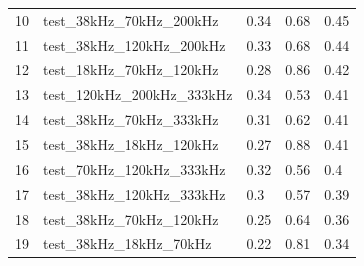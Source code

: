 \begin{longtable}{lllll}
10                     & test\_38kHz\_70kHz\_200kHz                  & 0.34                           & 0.68                        & 0.45                           \\
11                     & test\_38kHz\_120kHz\_200kHz                 & 0.33                           & 0.68                        & 0.44                           \\
12                     & test\_18kHz\_70kHz\_120kHz                  & 0.28                           & 0.86                        & 0.42                           \\
13                     & test\_120kHz\_200kHz\_333kHz                & 0.34                           & 0.53                        & 0.41                           \\
14                     & test\_38kHz\_70kHz\_333kHz                  & 0.31                           & 0.62                        & 0.41                           \\
15                     & test\_38kHz\_18kHz\_120kHz                  & 0.27                           & 0.88                        & 0.41                           \\
16                     & test\_70kHz\_120kHz\_333kHz                 & 0.32                           & 0.56                        & 0.4                            \\
17                     & test\_38kHz\_120kHz\_333kHz                 & 0.3                            & 0.57                        & 0.39                           \\
18                     & test\_38kHz\_70kHz\_120kHz                  & 0.25                           & 0.64                        & 0.36                           \\
19                     & test\_38kHz\_18kHz\_70kHz                   & 0.22                           & 0.81                        & 0.34                           \\ \hline
\end{longtable}

